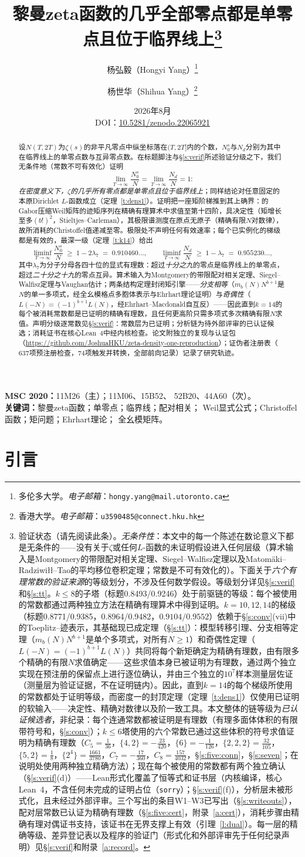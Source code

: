 \documentclass[11pt]{article}
\title{\bf 黎曼zeta函数的几乎全部零点都是单零点且位于临界线上\thanks{验证状态（请先阅读此条）。\emph{无条件性}：本文中的每一个陈述在数论意义下都是无条件的——没有关于$\zeta$或任何$L$-函数的未证明假设进入任何层级（算术输入是Montgomery的带限配对相关定理、Siegel--Walfisz定理以及Matom\"aki--Radziwi\l{}\l--Tao的平均移位卷积定理；常数是不可有效化的）。下面关于\emph{六个有理常数的验证来源}的等级划分，不涉及任何数学假设。等级划分详见\S\ref{s:verif}和\S\ref{s:tt}。$k\le8$的子塔（标题0.8493/0.9246）处于前驱链的等级：每个被使用的常数都通过两种独立方法在精确有理算术中得到证明。$k=10,12,14$的梯级（标题0.8771/0.9385，0.8964/0.9482，$\mathbf{0.9104/0.9552}$）依赖于\S\ref{s:conv}(vii)中的Toeplitz--迹表示，其基础现已成定理（\S\ref{s:tt}）：模型转移引理、分支相等定理（$m_b(N)N^{b+1}$是单个多项式，对所有$N\ge1$）和奇偶性定理（$L(-N)=(-1)^{b+1}L(N)$）共同将每个新矩确定为精确有理数，由有限多个精确的有限$N$求值确定——这些求值本身已被证明为有理数，通过两个独立实现在预注册的保留点上进行逐位确认，并由三个独立的$10^{7}$样本测量层佐证（测量层为验证证据，不在证明链内）。因此，直到$k=14$的每个梯级所使用的常数都处于证明等级，而密度一的封顶定理（定理~\ref{t:dens1}）仅使用已证明的软输入——决定性、精确对数律以及阶一致工具。本文整体的链等级为\emph{已认证候选者}，非纪录：每个连通常数都被证明是有理数（有理多面体体积的有限带符号和，\S\ref{s:conv}）；$k\le6$塔使用的六个常数已通过这些体积的符号求值证明为精确有理数（$C_5=\tfrac1{36}$，$\{4,2\}=-\tfrac{23}{420}$，$\{6\}=-\tfrac1{126}$，$\{2,2,2\}=\tfrac{32}{105}$，$\{5,2\}=\tfrac18$，$\{2^4\}=\tfrac{1661}{3780}$，$C_7=-\tfrac{17}{360}$，$C_8=\tfrac{157}{4032}$，\S\ref{s:five:conn}，\S\ref{s:seven}；在说明处使用两种独立精确方法）；现在每个被使用的常数都有两个独立确认（\S\ref{s:verif}(d)）——Lean形式化覆盖了恒等式和证书层（内核编译，核心Lean~4，不含任何未完成的证明占位（\texttt{sorry}）；\S\ref{s:verif}(f)），分析层未被形式化，且未经过外部评审。三个写出的条目W1--W3已写出（\S\ref{s:writeouts}），配对层常数已认证为精确有理数（\S\ref{s:five:cert}，附录~\ref{a:cert}），消耗步骤由精确有理对偶证书支持，该证书在无界支撑上有效（引理~\ref{l:dual}）。每一层的精确等级、差异登记表以及程序的验证门（形式化和外部评审先于任何纪录声明）见\S\ref{s:verif}和附录~\ref{a:record}。}}
\author{杨弘毅（Hongyi Yang）\thanks{多伦多大学。\textit{电子邮箱}：\texttt{hongy.yang@mail.utoronto.ca}}
\and 杨世华（Shihua Yang）\thanks{香港大学。\textit{电子邮箱}：\texttt{u3590485@connect.hku.hk}}}
\date{2026年8月\\[4pt]
\small DOI：\href{https://doi.org/10.5281/zenodo.22065921}%
{10.5281/zenodo.22065921}}
\numberwithin{equation}{section}
\theoremstyle{definition}
\theoremstyle{remark}
\begin{document}
\maketitle

\begin{abstract}
设$N(T,2T)$为$\zeta(s)$的非平凡零点中纵坐标落在$(T,2T]$内的个数，$N_0^{s}$与$N_d$分别为其中在临界线上的单零点数与互异零点数。在标题脚注与\S\ref{s:verif}所述验证分级之下，我们无条件地（常数不可有效化）证明
\[
\lim_{T\to\infty}\frac{N_0^{s}}{N}
=\lim_{T\to\infty}\frac{N_d}{N}=1 :
\]
\emph{在密度意义下，$\zeta$的几乎所有零点都是单零点且位于临界线上}；同样结论对任意固定的本原Dirichlet $L$-函数成立（定理~\ref{t:dens1}）。证明把一座矩阶梯推到其上确界：\cite{C26}的Gabor压缩Weil矩阵的迹矩序列在精确有理算术中求值至第十四阶，具决定性（矩增长至多$(b!)^{2}$，Stieltjes--Carleman），其极限谱测度在原点无原子（精确有限$N$对数律），故所消耗的Christoffel值递减至零。极限处不声明任何有效速率；每个已实例化的梯级都是有效的，最深一级（定理~\ref{t:k14}）给出
\[
\liminf_{T\to\infty}\frac{N_0^{s}}{N}
\;\ge\;1-2\lambda_7\;=\;0.910460\ldots,
\qquad
\liminf_{T\to\infty}\frac{N_d}{N}
\;\ge\;1-\lambda_7\;=\;0.955230\ldots,
\]
其中$\lambda_7$为分子分母各四十位的显式有理数：超过\emph{十分之九}的零点是临界线上的单零点，超过\emph{二十分之十九}的零点互异。算术输入为Montgomery的带限配对相关定理、Siegel--Walfisz定理与Vaughan估计；两条结构定理封闭矩引擎——\emph{分支相等}（$m_b(N)N^{b+1}$是$N$的单一多项式，经全幺模格点多胞体表示与Ehrhart理论证明）与\emph{奇偶性}（$L(-N)=(-1)^{b+1}L(N)$，经Ehrhart--Macdonald自互反）——因此直到$k=14$的每个被消耗常数都是已证明的精确有理数，且任何更高阶只需多项式多次精确有限$N$求值。声明分级逐常数见\S\ref{s:verif}：常数层为已证明；分析链为待外部评审的已认证候选；消耗证书在核心Lean~4中经内核检查。论文附独立的复现与认证包（\url{https://github.com/JoshuaHKU/zeta-density-one-reproduction}）；证伪者注册表（$637$项预注册检查，$74$项触发并转换，全部前向记录）记录了研究轨迹。
\end{abstract}

\medskip
\noindent\textbf{MSC 2020：}11M26（主）；11M06、15B52、
52B20、44A60（次）。\\
\textbf{关键词：}黎曼zeta函数；单零点；临界线；配对相关；
Weil显式公式；Christoffel函数；矩问题；Ehrhart理论；
全幺模矩阵。

\newpage
\tableofcontents
\newpage
\section{引言}\label{s:intro}
\end{document}
